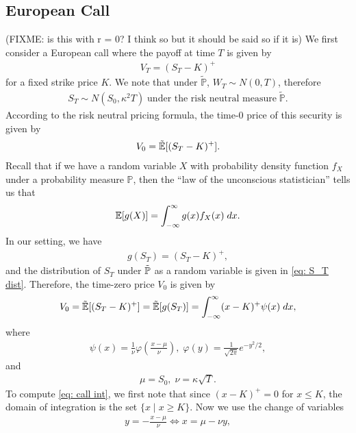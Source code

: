\documentclass[reqno]{amsart}
\begin{document}
\subsection{European Call}
(FIXME: is this with r = 0? I think so but it should be said so if it is)
We first consider a European call where the payoff at time $T$ is given by 
\begin{align}
	 V_T = (S_T - K)^+
\end{align}
for a fixed strike price $K$. We note that under $\tilde{\mathbb{P}}$, $ W_T \sim N(0, T)$, therefore
\begin{align}\label{eq: S_T dist}
S_T \sim N(S_0, \kappa^2T) \; \text{under the risk neutral measure} \; \tilde{\mathbb{P}}.
\end{align}
According to the risk neutral pricing formula, the time-0 price of this security is given by 
\begin{align}
	 V_0 = \tilde{\mathbb{E}}[(S_T - K)^+].
\end{align}
Recall that if we have a random variable $X$ with probability density function $f_X$ under a probability measure $\mathbb{P}$, then the ``law of the unconscious statistician'' tells us that 
\begin{align}
	 \mathbb{E}[g(X)] = \int_{-\infty}^\infty g(x) f_X(x) \; dx.
\end{align}
In our setting, we have 
\begin{align}
	 g(S_T) = (S_T - K)^+,
\end{align}
and the distribution of $S_T$ under $\tilde{\mathbb{P}}$ as a random variable is given in \eqref{eq: S_T dist}. Therefore, the time-zero price $V_0$ is given by 
\begin{align}\label{eq: call int}
	 V_0 = \tilde{\mathbb{E}}[(S_T - K)^+] =  \tilde{\mathbb{E}}[g(S_T)] = \int_{-\infty}^\infty (x-K)^+ \psi(x) \; dx,
\end{align}
where 
\begin{align}
	 \psi(x) = \frac{1}{\nu}\varphi\left(\frac{x-\mu}{\nu}\right), \; \varphi(y) = \frac{1}{\sqrt{2\pi}}e^{-y^2/2}, 
\end{align}
and
\begin{align}
	 \mu = S_0, \; \nu = \kappa \sqrt{T}.
\end{align}
To compute \eqref{eq: call int}, we first note that since $(x-K)^+ = 0$ for $x \le K$, the domain of integration is the set $\{x \mid x \ge K\}$. Now we use the change of variables 
\begin{align}
	 y = -\frac{x-\mu}{\nu} \Longleftrightarrow x = \mu - \nu y,
\end{align}
\end{document}
